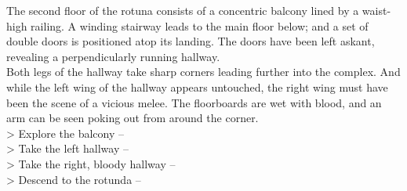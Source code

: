 The second floor of the rotuna consists of a concentric balcony lined by a waist-high railing. A winding stairway leads to the main floor below; and a set of double doors is positioned atop its landing. The doors have been left askant, revealing a perpendicularly running hallway.\\

Both legs of the hallway take sharp corners leading further into the complex. And while the left wing of the hallway appears untouched, the right wing must have been the scene of a vicious melee. The floorboards are wet with blood, and an arm can be seen poking out from around the corner.\\

> Explore the balcony -- \\
> Take the left hallway -- \\
> Take the right, bloody hallway -- \\
> Descend to the rotunda -- 